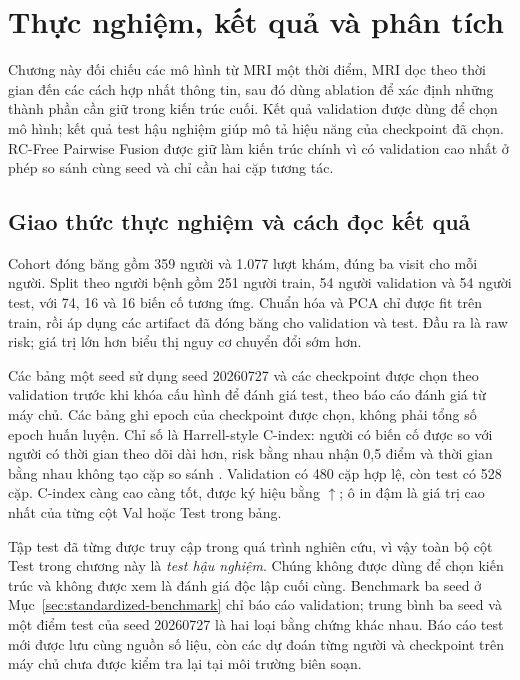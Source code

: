 \chapter{Thực nghiệm, kết quả và phân tích}
\label{chap:results}

Chương này đối chiếu các mô hình từ MRI một thời điểm, MRI dọc theo thời gian đến các cách hợp nhất thông tin, sau đó dùng ablation để xác định những thành phần cần giữ trong kiến trúc cuối. Kết quả validation được dùng để chọn mô hình; kết quả test hậu nghiệm giúp mô tả hiệu năng của checkpoint đã chọn. RC-Free Pairwise Fusion được giữ làm kiến trúc chính vì có validation cao nhất ở phép so sánh cùng seed và chỉ cần hai cặp tương tác.

\section{Giao thức thực nghiệm và cách đọc kết quả}
\label{sec:experimental-protocol}
Cohort đóng băng gồm 359 người và 1.077 lượt khám, đúng ba visit cho mỗi người. Split theo người bệnh gồm 251 người train, 54 người validation và 54 người test, với 74, 16 và 16 biến cố tương ứng. Chuẩn hóa và PCA chỉ được fit trên train, rồi áp dụng các artifact đã đóng băng cho validation và test. Đầu ra là raw risk; giá trị lớn hơn biểu thị nguy cơ chuyển đổi sớm hơn.

Các bảng một seed sử dụng seed 20260727 và các checkpoint được chọn theo validation trước khi khóa cấu hình để đánh giá test, theo báo cáo đánh giá từ máy chủ. Các bảng ghi epoch của checkpoint được chọn, không phải tổng số epoch huấn luyện. Chỉ số là Harrell-style C-index: người có biến cố được so với người có thời gian theo dõi dài hơn, risk bằng nhau nhận 0,5 điểm và thời gian bằng nhau không tạo cặp so sánh \cite{harrell1996multivariable}. Validation có 480 cặp hợp lệ, còn test có 528 cặp. C-index càng cao càng tốt, được ký hiệu bằng $\uparrow$; ô in đậm là giá trị cao nhất của từng cột Val hoặc Test trong bảng.

Tập test đã từng được truy cập trong quá trình nghiên cứu, vì vậy toàn bộ cột Test trong chương này là \emph{test hậu nghiệm}. Chúng không được dùng để chọn kiến trúc và không được xem là đánh giá độc lập cuối cùng. Benchmark ba seed ở Mục~\ref{sec:standardized-benchmark} chỉ báo cáo validation; trung bình ba seed và một điểm test của seed 20260727 là hai loại bằng chứng khác nhau. Báo cáo test mới được lưu cùng nguồn số liệu, còn các dự đoán từng người và checkpoint trên máy chủ chưa được kiểm tra lại tại môi trường biên soạn.

